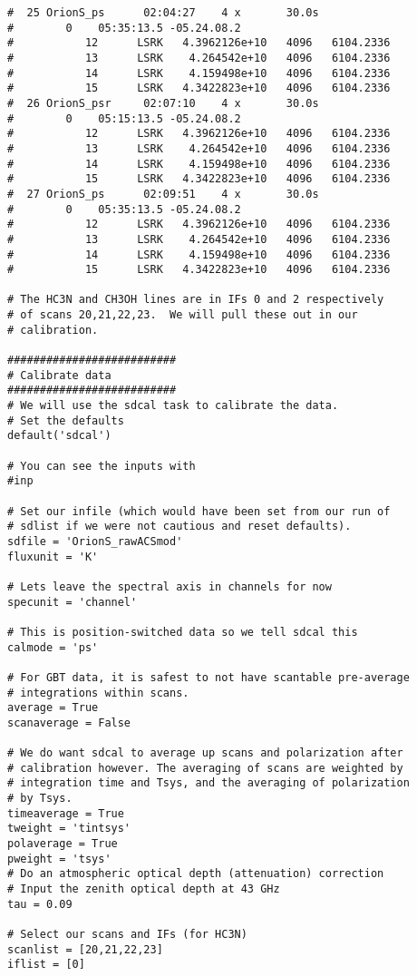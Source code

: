 \begin{verbatim}
#  25 OrionS_ps      02:04:27    4 x       30.0s
#        0    05:35:13.5 -05.24.08.2
#           12      LSRK   4.3962126e+10   4096   6104.2336
#           13      LSRK    4.264542e+10   4096   6104.2336
#           14      LSRK    4.159498e+10   4096   6104.2336
#           15      LSRK   4.3422823e+10   4096   6104.2336
#  26 OrionS_psr     02:07:10    4 x       30.0s
#        0    05:15:13.5 -05.24.08.2
#           12      LSRK   4.3962126e+10   4096   6104.2336
#           13      LSRK    4.264542e+10   4096   6104.2336
#           14      LSRK    4.159498e+10   4096   6104.2336
#           15      LSRK   4.3422823e+10   4096   6104.2336
#  27 OrionS_ps      02:09:51    4 x       30.0s
#        0    05:35:13.5 -05.24.08.2
#           12      LSRK   4.3962126e+10   4096   6104.2336
#           13      LSRK    4.264542e+10   4096   6104.2336
#           14      LSRK    4.159498e+10   4096   6104.2336
#           15      LSRK   4.3422823e+10   4096   6104.2336

# The HC3N and CH3OH lines are in IFs 0 and 2 respectively
# of scans 20,21,22,23.  We will pull these out in our
# calibration.

##########################
# Calibrate data
##########################
# We will use the sdcal task to calibrate the data.
# Set the defaults
default('sdcal')

# You can see the inputs with
#inp

# Set our infile (which would have been set from our run of
# sdlist if we were not cautious and reset defaults).
sdfile = 'OrionS_rawACSmod'
fluxunit = 'K'

# Lets leave the spectral axis in channels for now
specunit = 'channel'

# This is position-switched data so we tell sdcal this
calmode = 'ps'

# For GBT data, it is safest to not have scantable pre-average
# integrations within scans.
average = True
scanaverage = False

# We do want sdcal to average up scans and polarization after
# calibration however. The averaging of scans are weighted by 
# integration time and Tsys, and the averaging of polarization 
# by Tsys.
timeaverage = True
tweight = 'tintsys'
polaverage = True
pweight = 'tsys'
# Do an atmospheric optical depth (attenuation) correction
# Input the zenith optical depth at 43 GHz
tau = 0.09

# Select our scans and IFs (for HC3N)
scanlist = [20,21,22,23]
iflist = [0]


\end{verbatim}
